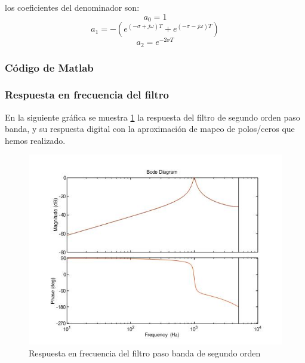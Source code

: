 \documentclass[titlepage]{article}
\begin{document}
los coeficientes del denominador son:
	\begin{equation}
		a_0=1
	\end{equation}
	\begin{equation}
		a_1=-(e^{(-\sigma+j\omega)T}+e^{(-\sigma-j\omega)T})
	\end{equation}
	\begin{equation}
		a_2=e^{-2{\sigma}T}
	\end{equation}

\subsubsection{Código de Matlab}

\subsubsection{Respuesta en frecuencia del filtro}
En la siguiente gráfica se muestra \ref{fig:bandpassdiscrete} la respuesta del filtro de segundo orden paso banda, y su respuesta digital con la aproximación de mapeo de polos/ceros que hemos realizado. 
\begin{figure}[H]
  \centering
	\includegraphics[scale=0.5]{bandpassdiscrete}
  \caption{Respuesta en frecuencia del filtro paso banda de segundo orden}
  \label{fig:bandpassdiscrete}
\end{figure}
\end{document}
